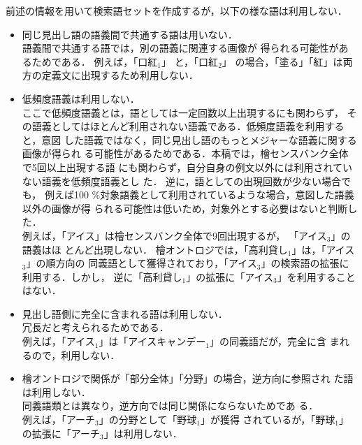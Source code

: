 \documentclass[japanese]{jnlp_1.4}
\newcommand{\gogi}[1]{}
\begin{document}
 前述の情報を用いて検索語セットを作成するが，以下の様な語は利用しない．
 \begin{itemize}
 \item 同じ見出し語の語義間で共通する語は用いない．\\
語義間で共通する語では，別の語義に関連する画像が
得られる可能性があるためである．
       例えば，「口紅$_1$」 \gogi{化粧品の一種。唇に\ul{塗る}\ul{紅}。…}
       と，「口紅$_2$」 \gogi{物の周り、特に陶磁器の周囲に赤い色を\ul{塗る}こと。また、そ
 の\ul{紅}。} の場合，「塗る」「紅」は両方の定義文に出現するため利用しない．

 \item 低頻度語義は利用しない．\\
ここで低頻度語義とは，語としては一定回数以上出現するにも関わらず，
その語義としてはほとんど利用されない語義である．低頻度語義を利用すると，意図
した語義ではなく，同じ見出し語のもっとメジャーな語義に関する画像が得られ
る可能性があるためである．本稿では，檜センスバンク全体で5回以上出現する語
にも関わらず，自分自身の例文以外には利用されていない語義を低頻度語義とし
た．
逆に，語としての出現回数が少ない場合でも，
例えば100 \%対象語義として利用されているような場合，意図した語義以外の画像が得
       られる可能性は低いため，対象外とする必要はないと判断した．\\
 例えば，「アイス」は檜センスバンク全体で9回出現するが，
「アイス$_3$」\gogi{高利貸し$_1$ ．}の語義はほ
 とんど出現しない．
 檜オントロジでは，「高利貸し$_1$」は，「アイス$_3$」の順方向の
同義語として獲得されており，「アイス$_3$」の検索語の拡張に利用する．しかし，
 逆に「高利貸し$_1$」の拡張に「アイス$_3$」を利用することはない．

 \item 見出し語側に完全に含まれる語は利用しない．\\
冗長だと考えられるためである．\\
 例えば，「アイス$_1$」は「アイスキャンデー$_1$」の同義語だが，完全に含
       まれるので，利用しない．


  \item 檜オントロジで関係が「部分全体」「分野」の場合，逆方向に参照され
	た語は利用しない．\\
	同義語類とは異なり，逆方向では同じ関係にならないためであ
	る．\\
  例えば，「アーチ$_3$」の分野として「野球$_1$」が獲得
  されているが，「野球$_1$」の拡張に「アーチ$_3$」は利用しない．

 \end{itemize}
\end{document}
